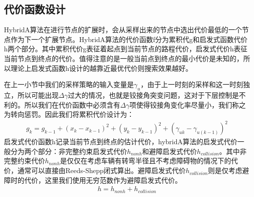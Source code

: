 \documentclass[master,academic]{ysuthesis} %
\begin{document}
		\subsection{代价函数设计}
		HybridA算法在进行节点的扩展时，会从采样出来的节点中选出代价最低的一个节点作为下一个扩展节点。HybridA算法的代价函数f分为累积代g和启发式函数代价h两个部分。其中累积代价g表征着起点到当前节点的路程代价，启发式代价h表征当前节点到终点的代价。值得注意的是一般当前点到终点的最小代价是未知的，所以理论上启发式函数h设计的越靠近最优代价则搜索效果越好。
		
		在上一小节中我们的采样策略的输入变量是$\gamma_u$，由于上一时刻的采样和这一时刻独立，所以可能出现$\Delta {\gamma}$过大的情况，也就是铰接角突变问题，这对于下层控制是不利的。所以我们在代价函数中必须含有$\Delta {\gamma}$项使得铰接角变化率尽量小，我们称之为转向惩罚。因此我们将累积代价设计为：
		\begin{equation}
			\begin{aligned}
				g_k=g_{k-1}+ (x_k-x_{k-1} ) ^2+ (y_k-y_{k-1} ) ^2+ (\gamma _{uk}-\gamma _{u (k-1 )} ) ^2
			\end{aligned}
		\end{equation}
		启发式代价函数h记录当前节点到终点的估计代价，hybridA算法的启发式代价一般分为两个部分：非完整约束启发式代价$h_{nonh}$和避障启发式代价$h_{collision}$。其中非完整约束代价$h_{nonh}$是仅仅在考虑车辆有转弯半径且不考虑障碍物的情况下的代价，通常可以直接由Reeds-Shepp闭式算出。避障启发式代价$h_{collision}$则是仅考虑避障时的代价，这里我们使用无穷范数作为避障启发式代价。
		\begin{equation}
			\begin{aligned}
				h = h_{nonh}+h_{collision}
			\end{aligned}
		\end{equation}
\end{document}
